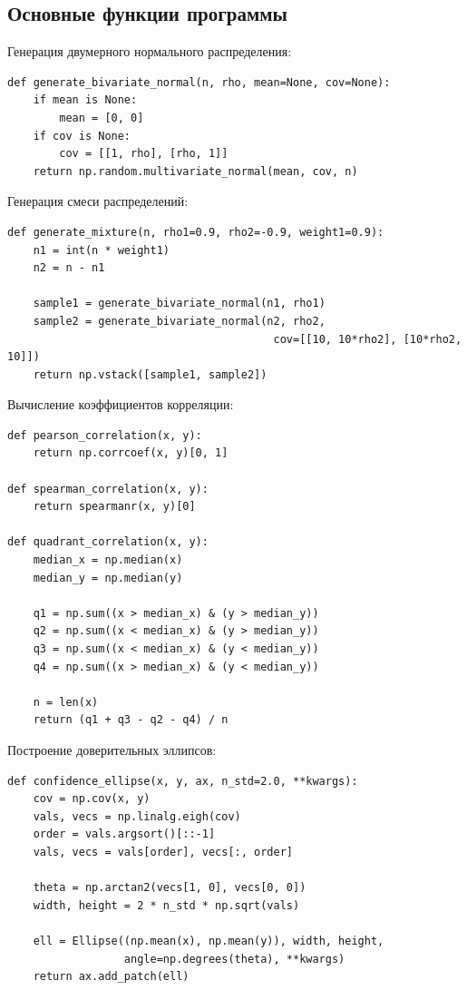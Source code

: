 \documentclass[12pt, a4paper]{article}
\begin{document}
\subsection{Основные функции программы}

Генерация двумерного нормального распределения:
\begin{lstlisting}
def generate_bivariate_normal(n, rho, mean=None, cov=None):
    if mean is None:
        mean = [0, 0]
    if cov is None:
        cov = [[1, rho], [rho, 1]]
    return np.random.multivariate_normal(mean, cov, n)
\end{lstlisting}

Генерация смеси распределений:
\begin{lstlisting}
def generate_mixture(n, rho1=0.9, rho2=-0.9, weight1=0.9):
    n1 = int(n * weight1)
    n2 = n - n1
    
    sample1 = generate_bivariate_normal(n1, rho1)
    sample2 = generate_bivariate_normal(n2, rho2, 
                                         cov=[[10, 10*rho2], [10*rho2, 10]])
    return np.vstack([sample1, sample2])
\end{lstlisting}

Вычисление коэффициентов корреляции:
\begin{lstlisting}
def pearson_correlation(x, y):
    return np.corrcoef(x, y)[0, 1]

def spearman_correlation(x, y):
    return spearmanr(x, y)[0]

def quadrant_correlation(x, y):
    median_x = np.median(x)
    median_y = np.median(y)
    
    q1 = np.sum((x > median_x) & (y > median_y))
    q2 = np.sum((x < median_x) & (y > median_y))
    q3 = np.sum((x < median_x) & (y < median_y))
    q4 = np.sum((x > median_x) & (y < median_y))
    
    n = len(x)
    return (q1 + q3 - q2 - q4) / n
\end{lstlisting}

Построение доверительных эллипсов:
\begin{lstlisting}
def confidence_ellipse(x, y, ax, n_std=2.0, **kwargs):
    cov = np.cov(x, y)
    vals, vecs = np.linalg.eigh(cov)
    order = vals.argsort()[::-1]
    vals, vecs = vals[order], vecs[:, order]
    
    theta = np.arctan2(vecs[1, 0], vecs[0, 0])
    width, height = 2 * n_std * np.sqrt(vals)
    
    ell = Ellipse((np.mean(x), np.mean(y)), width, height, 
                  angle=np.degrees(theta), **kwargs)
    return ax.add_patch(ell)
\end{lstlisting}
\end{document}
